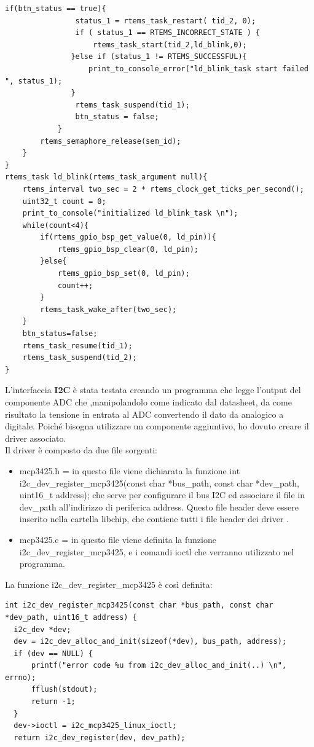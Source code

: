 \documentclass[12pt, a4paper, titlepage, oneside]{book}
\begin{document}
\begin{flushleft}
\begin{lstlisting}[style = CStyle]
			if(btn_status == true){
				status_1 = rtems_task_restart( tid_2, 0);
				if ( status_1 == RTEMS_INCORRECT_STATE ) {
					rtems_task_start(tid_2,ld_blink,0);
			   }else if (status_1 != RTEMS_SUCCESSFUL){
				   print_to_console_error("ld_blink_task start failed ", status_1);
			   }
				rtems_task_suspend(tid_1);
				btn_status = false;
			}
		rtems_semaphore_release(sem_id);
	}
}
rtems_task ld_blink(rtems_task_argument null){
	rtems_interval two_sec = 2 * rtems_clock_get_ticks_per_second();
	uint32_t count = 0;
	print_to_console("initialized ld_blink_task \n");
	while(count<4){
		if(rtems_gpio_bsp_get_value(0, ld_pin)){
			rtems_gpio_bsp_clear(0, ld_pin);
		}else{
			rtems_gpio_bsp_set(0, ld_pin);
			count++;
		}
		rtems_task_wake_after(two_sec);
	}
	btn_status=false;
	rtems_task_resume(tid_1);
	rtems_task_suspend(tid_2);
}
\end{lstlisting}
\newpage

L'interfaccia \textbf{I2C} è stata testata creando un programma che legge l'output del componente ADC che ,manipolandolo come indicato dal datasheet, da come risultato la tensione in entrata al ADC convertendo il dato da analogico a digitale. Poiché bisogna utilizzare un componente aggiuntivo, ho dovuto creare il driver associato.\\
Il driver è composto da due file sorgenti:
\begin{itemize}
    \item mcp3425.h = in questo file viene dichiarata la funzione int i2c\_dev\_register\_mcp3425(const char *bus\_path, const char *dev\_path, uint16\_t address); che serve per configurare il bus I2C ed associare il file in dev\_path all'indirizzo di periferica address.
    Questo file header deve essere inserito nella cartella libchip, che contiene tutti i file header dei driver .
    \item mcp3425.c =  in questo file viene definita la funzione i2c\_dev\_register\_mcp3425, e i comandi ioctl che verranno utilizzato nel programma.
\end{itemize}

La funzione i2c\_dev\_register\_mcp3425 è così definita:
\begin{lstlisting}[style = CStyle]
int i2c_dev_register_mcp3425(const char *bus_path, const char *dev_path, uint16_t address) {
  i2c_dev *dev;
  dev = i2c_dev_alloc_and_init(sizeof(*dev), bus_path, address);
  if (dev == NULL) {
	  printf("error code %u from i2c_dev_alloc_and_init(..) \n", errno);
	  fflush(stdout);
	  return -1;
  }
  dev->ioctl = i2c_mcp3425_linux_ioctl;
  return i2c_dev_register(dev, dev_path);


\end{lstlisting}
\end{flushleft}
\end{document}

